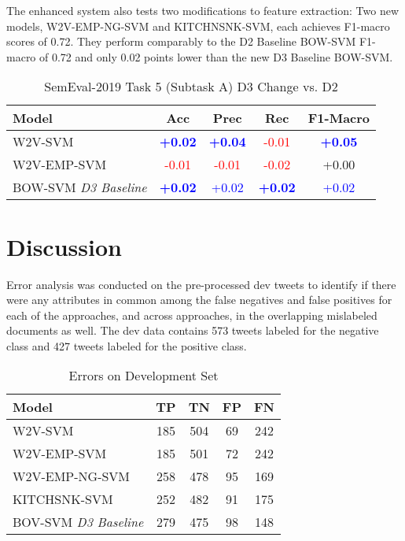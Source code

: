 \documentclass[11pt,a4paper]{article}
\begin{document}
The enhanced system also tests two modifications to feature extraction:  Two new models, \textsc{W2V-EMP-NG-SVM} and \textsc{KITCHNSNK-SVM}, each achieves F1-macro scores of 0.72. They perform comparably to the D2 Baseline \textsc{BOW-SVM} F1-macro of 0.72 and only 0.02 points lower than the new D3 Baseline \textsc{BOW-SVM}.



\begin{table}[h]
\centering
\caption{SemEval-2019 Task 5 (Subtask A) D3 Change vs. D2}
\label{tab:resultschange}
\scriptsize
\begin{tabular}{lcccc}
\hline
Model & Acc & Prec & Rec & F1-Macro \\ \hline
\textsc{W2V-SVM} & \textcolor{blue}{\textbf{+0.02}} & \textcolor{blue}{\textbf{+0.04}} & \textcolor{red}{-0.01} & \textcolor{blue}{\textbf{+0.05}} \\
\textsc{W2V-EMP-SVM} & \textcolor{red}{-0.01} & \textcolor{red}{-0.01} & \textcolor{red}{-0.02} & +0.00 \\
\textsc{BOW-SVM} \textit{D3 Baseline} & \textcolor{blue}{\textbf{+0.02}} & \textcolor{blue}{+0.02} & \textcolor{blue}{\textbf{+0.02}} & \textcolor{blue}{+0.02} \\
\end{tabular}
\end{table}



\section{Discussion}
Error analysis was conducted on the pre-processed dev tweets to identify if there were any attributes in common among the false negatives and false positives for each of the approaches, and across approaches, in the overlapping mislabeled documents as well. The dev data contains 573 tweets labeled for the negative class and 427 tweets labeled for the positive class.

\begin{table}[h]
\centering
\caption{Errors on Development Set}
\label{tab:errors}
\begin{tabular}{lcccc}
\hline
Model & TP & TN & FP & FN \\
\hline
W2V-SVM & 185 & 504 & 69 & 242 \\
W2V-EMP-SVM & 185 & 501 & 72 & 242 \\
W2V-EMP-NG-SVM & 258 & 478 & 95 & 169 \\
KITCHSNK-SVM & 252 & 482 & 91 & 175 \\
BOV-SVM \textit{D3 Baseline} & 279 & 475 & 98 & 148 \\
 
\hline
\end{tabular}
\end{table}
\end{document}
